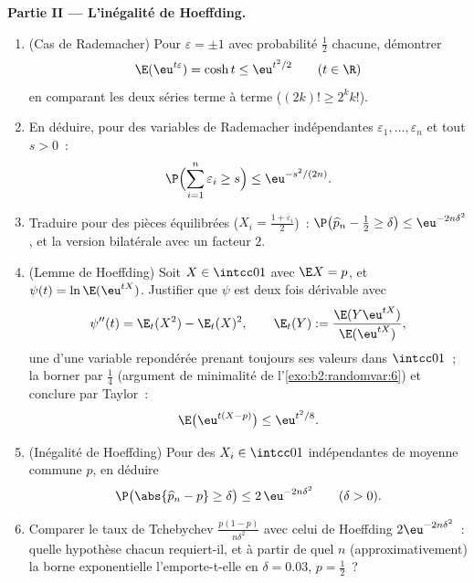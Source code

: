 \begin{problem}
\medskip
\noindent\textbf{Partie II --- L'inégalité de Hoeffding.}
\begin{enumerate}[resume]
  \item (Cas de Rademacher) Pour $\varepsilon = \pm1$ avec
        probabilité $\frac12$ chacune, démontrer
        \[
        \E(\eu^{t\varepsilon}) = \cosh t \leq \eu^{t^2/2}
        \qquad (t \in \R)
        \]
        en comparant les deux séries terme à terme ($(2k)! \geq
        2^kk!$).
  \item En déduire, pour des variables de Rademacher indépendantes
        $\varepsilon_1, \dots, \varepsilon_n$ et tout $s >
        0$~:
        \[
        \P\Bigl(\sum_{i=1}^n\varepsilon_i \geq s\Bigr)
        \leq \eu^{-s^2/(2n)} .
        \]
  \item Traduire pour des pièces équilibrées ($X_i =
        \frac{1+\varepsilon_i}2$)~: $\P\bigl(\widehat p_n -
        \tfrac12 \geq \delta\bigr) \leq \eu^{-2n\delta^2}$,
        et la version bilatérale avec un facteur $2$.
  \item (Lemme de Hoeffding) Soit $X \in \intcc01$ avec $\E X =
        p$, et $\psi(t) = \ln\E(\eu^{tX})$. Justifier que
        $\psi$ est deux fois dérivable avec
        \[
        \psi''(t) = \E_t(X^2) - \E_t(X)^2, \qquad
        \E_t(Y) := \frac{\E(Y\eu^{tX})}{\E(\eu^{tX})},
        \]
        une \emph{} d'une variable repondérée prenant
        toujours ses valeurs dans $\intcc01$~; la borner par $\frac14$
        (argument de minimalité de l'\cref{exo:b2:randomvar:6}) et
        conclure par Taylor~:
        \[
        \E\bigl(\eu^{t(X - p)}\bigr) \leq \eu^{t^2/8} .
        \]
  \item (Inégalité de Hoeffding) Pour des $X_i \in
        \intcc01$ indépendantes de moyenne commune $p$, en déduire
        \[
        \P\bigl(\abs{\widehat p_n - p} \geq \delta\bigr)
        \leq 2\,\eu^{-2n\delta^2}
        \qquad (\delta > 0).
        \]
  \item Comparer le taux de Tchebychev
        $\frac{p(1-p)}{n\delta^2}$ avec celui de Hoeffding
        $2\eu^{-2n\delta^2}$~: quelle hypothèse chacun
        requiert-il, et à partir de quel $n$ (approximativement) la
        borne exponentielle l'emporte-t-elle en $\delta = 0.03$, $p =
        \frac12$~?
\end{enumerate}


\end{problem}
